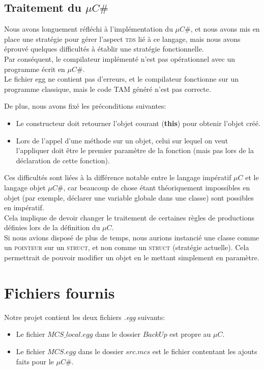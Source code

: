 \documentclass[11pt,a4paper]{report}
\begin{document}
\subsection{Traitement du $\mu C \#$}

Nous avons longuement réfléchi à l'implémentation du $\mu C \#$, et nous avons mis en place une stratégie pour gérer l'aspect \textsc{tds} lié à ce langage, mais nous avons éprouvé quelques difficultés à établir une stratégie fonctionnelle.\\
Par conséquent, le compilateur implémenté n'est pas opérationnel avec un programme écrit en $\mu C \#$.\\
Le fichier egg ne contient pas d'erreurs, et le compilateur fonctionne sur un programme classique, mais le code TAM généré n'est pas correcte.

De plus, nous avons fixé les préconditions suivantes: 
\begin{itemize}
\item Le constructeur doit retourner l'objet courant (\textbf{this}) pour obtenir l'objet créé.
\item Lors de l'appel d'une méthode sur un objet, celui sur lequel on veut l'appliquer doit être le premier paramètre de la fonction (mais pas lors de la déclaration de cette fonction).
\end{itemize}




Ces difficultés sont liées à la différence notable entre le langage impératif $\mu C$ et le langage objet $\mu C \#$, car beaucoup de chose étant théoriquement impossibles en objet (par exemple, déclarer une variable globale dans une classe) sont possibles en impératif.\\
 Cela implique de devoir changer le traitement de certaines règles de productions définies lors de la définition du $\mu C$. \\
Si nous avions disposé de plus de temps, nous aurions instancié une classe comme un \textsc{pointeur} sur un \textsc{struct}, et non comme un \textsc{struct} (stratégie actuelle). Cela permettrait de pouvoir modifier un objet en le mettant simplement en paramètre.

\section{Fichiers fournis}

Notre projet contient les deux fichiers \textsl{.egg} suivants: 
\begin{itemize}
\item Le fichier $MCS\_local.egg$ dans le dossier $BackUp$ est propre au $\mu C$.
\item Le fichier $MCS.egg$ dans le dossier $src.mcs$ est le fichier contentant les ajouts faits pour le $\mu C \#$.
\end{itemize}
\end{document}
